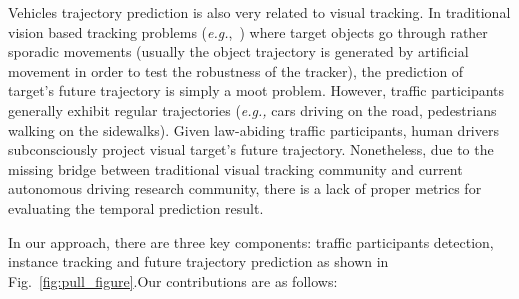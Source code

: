 \documentclass[10pt,twocolumn,letterpaper]{article}
\begin{document}
Vehicles trajectory prediction is also very related to visual tracking.
In traditional vision based tracking problems (\emph{e.g.},~\cite{wu2013online, wu2015object, mueller2016benchmark}) where target objects go through rather sporadic movements (usually the object trajectory is generated by artificial movement in order to test the robustness of the tracker), the prediction of target's future trajectory is simply a moot problem.
However, traffic participants generally exhibit regular trajectories (\emph{e.g.,} cars driving on the road, pedestrians walking on the sidewalks). Given law-abiding traffic participants, human drivers subconsciously project visual target's future trajectory.
Nonetheless, due to the missing bridge between traditional visual tracking community and current autonomous driving research community, there is a lack of proper metrics for evaluating the temporal prediction result.



In our approach, there are three key components: traffic participants detection, instance tracking and future trajectory prediction as shown in Fig.~\ref{fig:pull_figure}.Our contributions are as follows:
\end{document}
